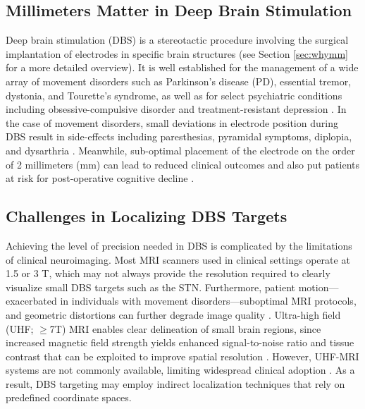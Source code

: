 \subsection{Millimeters Matter in Deep Brain Stimulation}
Deep brain stimulation (DBS) is a stereotactic procedure involving the surgical implantation of electrodes in specific brain structures (see Section \ref{sec:whymm} for a more detailed overview). It is well established for the management of a wide array of movement disorders such as Parkinson's disease (PD), essential tremor, dystonia, and Tourette’s syndrome, as well as for select psychiatric conditions including obsessive-compulsive disorder and treatment-resistant depression \cite{Lozano2019-dv}. In the case of movement disorders, small deviations in electrode position during DBS result in side-effects including paresthesias, pyramidal symptoms, diplopia, and dysarthria \cite{Buhmann2017-da}. Meanwhile, sub-optimal placement of the electrode on the order of 2 millimeters (mm) can lead to reduced clinical outcomes \cite{Horn2019-by} and also put patients at risk for post-operative cognitive decline \cite{Reich2022-jf}.

\subsection{Challenges in Localizing DBS Targets}
Achieving the level of precision needed in DBS is complicated by the limitations of clinical neuroimaging. Most MRI scanners used in clinical settings operate at 1.5 or 3 T, which may not always provide the resolution required to clearly visualize small DBS targets such as the STN. Furthermore, patient motion—exacerbated in individuals with movement disorders—suboptimal MRI protocols, and geometric distortions can further degrade image quality \cite{Boutet2021-vg, Chandran2016-eg, Lau2018-fp}. Ultra-high field (UHF; $\geq$7T) MRI enables clear delineation of small brain regions, since increased magnetic field strength yields enhanced signal-to-noise ratio and tissue contrast that can be exploited to improve spatial resolution \cite{Abosch2010-jn, Duchin2012-db, Lau2017-ea, Lau2020-dh, Lenglet2012-ii}. However, UHF-MRI systems are not commonly available, limiting widespread clinical adoption \cite{Clarke2020-ky}. As a result, DBS targeting may employ indirect localization techniques that rely on predefined coordinate spaces.

